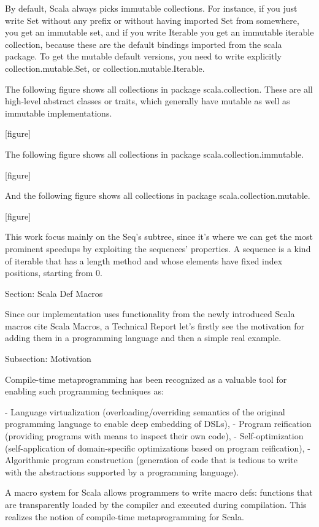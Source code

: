 By default, Scala always picks immutable collections. For instance, if you just
write Set without any prefix or without having imported Set from somewhere, you
get an immutable set, and if you write Iterable you get an immutable iterable
collection, because these are the default bindings imported from the scala
package. To get the mutable default versions, you need to write explicitly
collection.mutable.Set, or collection.mutable.Iterable.

The following figure shows all collections in package scala.collection. These
are all high-level abstract classes or traits, which generally have mutable as
well as immutable implementations.

[figure]

The following figure shows all collections in package
scala.collection.immutable.

[figure]

And the following figure shows all collections in package
scala.collection.mutable.

[figure]

This work focus mainly on the Seq's subtree, since it's where we can get the
most prominent speedups by exploiting the sequences' properties. A sequence is a
kind of iterable that has a length method and whose elements have fixed index
positions, starting from 0.


Section: Scala Def Macros

Since our implementation uses functionality from the newly introduced Scala
macros {cite Scala Macros, a Technical Report} let's firstly see the motivation
for adding them in a programming language and then a simple real example.


Subsection: Motivation

Compile-time metaprogramming has been recognized as a valuable tool for enabling
such programming techniques as:

- Language virtualization (overloading/overriding semantics of the original
programming language to enable deep embedding of DSLs),
- Program reification (providing programs with means to inspect their own code),
- Self-optimization (self-application of domain-specific optimizations based on
program reification),
- Algorithmic program construction (generation of code that is tedious to write
with the abstractions supported by a programming language).

A macro system for Scala allows programmers to write macro defs: functions that
are transparently loaded by the compiler and executed during compilation. This
realizes the notion of compile-time metaprogramming for Scala.

